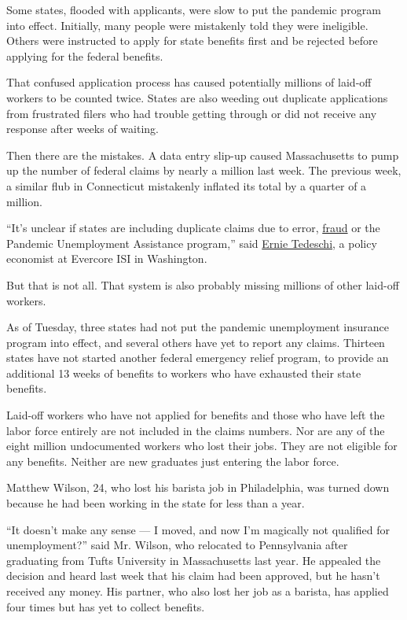 Some states, flooded with applicants, were slow to put the pandemic
program into effect. Initially, many people were mistakenly told they
were ineligible. Others were instructed to apply for state benefits
first and be rejected before applying for the federal benefits.

That confused application process has caused potentially millions of
laid-off workers to be counted twice. States are also weeding out
duplicate applications from frustrated filers who had trouble getting
through or did not receive any response after weeks of waiting.

Then there are the mistakes. A data entry slip-up caused Massachusetts
to pump up the number of federal claims by nearly a million last week.
The previous week, a similar flub in Connecticut mistakenly inflated its
total by a quarter of a million.

``It's unclear if states are including duplicate claims due to error,
\href{https://www.nytimes3xbfgragh.onion/2020/05/21/us/coronavirus-news-tracker.html?searchResultPosition=2}{fraud}
or the Pandemic Unemployment Assistance program,'' said
\href{https://twitter.com/ernietedeschi}{Ernie Tedeschi}, a policy
economist at Evercore ISI in Washington.

But that is not all. That system is also probably missing millions of
other laid-off workers.

As of Tuesday, three states had not put the pandemic unemployment
insurance program into effect, and several others have yet to report any
claims. Thirteen states have not started another federal emergency
relief program, to provide an additional 13 weeks of benefits to workers
who have exhausted their state benefits.

Laid-off workers who have not applied for benefits and those who have
left the labor force entirely are not included in the claims numbers.
Nor are any of the eight million undocumented workers who lost their
jobs. They are not eligible for any benefits. Neither are new graduates
just entering the labor force.

Matthew Wilson, 24, who lost his barista job in Philadelphia, was turned
down because he had been working in the state for less than a year.

``It doesn't make any sense --- I moved, and now I'm magically not
qualified for unemployment?'' said Mr. Wilson, who relocated to
Pennsylvania after graduating from Tufts University in Massachusetts
last year. He appealed the decision and heard last week that his claim
had been approved, but he hasn't received any money. His partner, who
also lost her job as a barista, has applied four times but has yet to
collect benefits.

